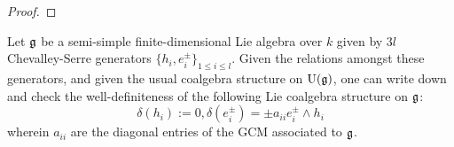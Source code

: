                 \begin{proof}
                     
                \end{proof}
            \begin{example}
                Let $\mathfrak{g}$ be a semi-simple finite-dimensional Lie algebra over $k$ given by $3l$ Chevalley-Serre generators $\{h_i, e_i^{\pm}\}_{1 \leq i \leq l}$. Given the relations amongst these generators, and given the usual coalgebra structure on $\mathrm{U}(\mathfrak{g})$, one can write down and check the well-definiteness of the following Lie coalgebra structure on $\mathfrak{g}$:
                    $$\delta(h_i) := 0, \delta(e_i^{\pm}) = \pm a_{ii} e_i^{\pm} \wedge h_i$$
                wherein $a_{ii}$ are the diagonal entries of the GCM associated to $\mathfrak{g}$. 
            \end{example}
            
